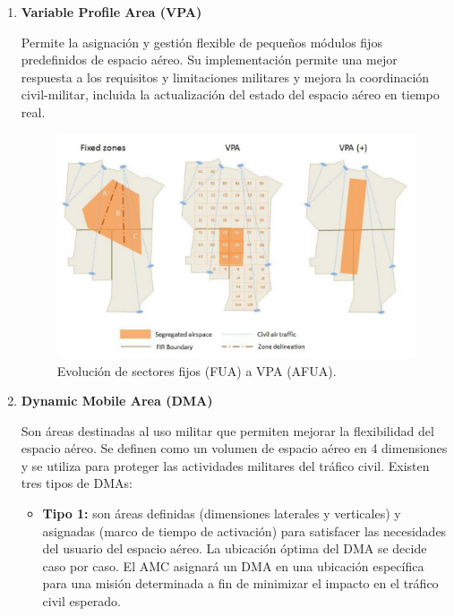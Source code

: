 \begin{enumerate}
    \item \textbf{Variable Profile Area (VPA)}
    
    Permite la asignación y gestión flexible de pequeños módulos fijos predefinidos de espacio aéreo. Su implementación permite una mejor respuesta a los requisitos y limitaciones militares y mejora la coordinación civil-militar, incluida la actualización del estado del espacio aéreo en tiempo real.

    \begin{figure}[H]
        \centering
        \includegraphics[width=1\linewidth]{figuras/vpa.png}
        \caption{Evolución de sectores fijos (FUA) a VPA (AFUA).}
        \label{fig:vpa}
    \end{figure}

    \item \textbf{Dynamic Mobile Area (DMA)}
    
    Son áreas destinadas al uso militar que permiten mejorar la flexibilidad del espacio aéreo. Se definen como un volumen de espacio aéreo en 4 dimensiones y se utiliza para proteger las actividades militares del tráfico civil. Existen tres tipos de DMAs:

    \begin{itemize}
        \item \textbf{Tipo 1:} son áreas definidas (dimensiones laterales y verticales) y asignadas (marco de tiempo de activación) para satisfacer las necesidades del usuario del espacio aéreo. La ubicación óptima del DMA se decide caso por caso. El AMC asignará un DMA en una ubicación específica para una misión determinada a fin de minimizar el impacto en el tráfico civil esperado.
        

\end{itemize}
\end{enumerate}
